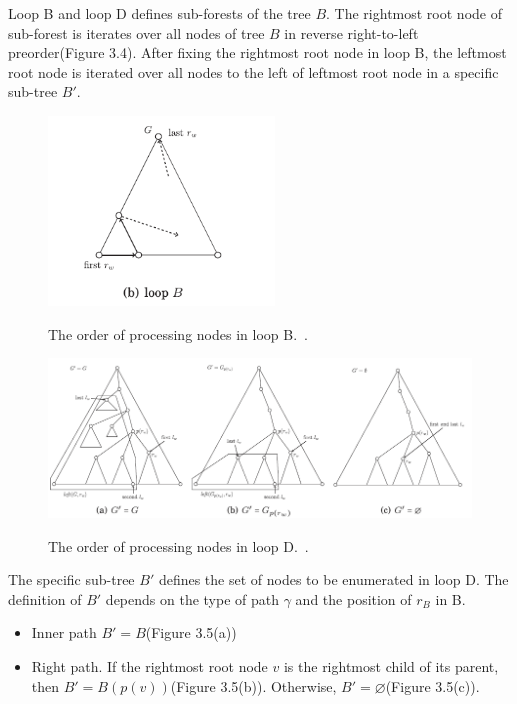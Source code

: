 Loop B and loop D defines sub-forests of the tree $B$. The rightmost root node of sub-forest is iterates over all nodes of tree $B$ in reverse right-to-left preorder(Figure 3.4). After fixing the rightmost root node in loop B, the leftmost root node is iterated over all nodes to the left of leftmost root node in a specific sub-tree $B'$. 

\begin{figure}
		\centering
		\includegraphics[width=6cm,clip]{Figures/loopB}
		\label{The order of processing nodes in loop B.} 
		\caption{The order of processing nodes in loop B.~\cite{pawlik2015efficient}.}
\end{figure}

\begin{figure}
		\centering
		\includegraphics[width=14cm,clip]{Figures/loopD}
		\label{The order of processing nodes in loop D.} 
		\caption{The order of processing nodes in loop D.~\cite{pawlik2015efficient}.}
\end{figure}

The specific sub-tree $B'$ defines the set of nodes to be enumerated in loop D. The definition of $B'$ depends on the type of path $\gamma$ and the position of $r_B$ in B.
\begin{itemize}
\item Inner path $B' = B$(Figure 3.5(a))
\item Right path. If the rightmost root node $v$ is the rightmost child of its parent, then $B' = B(p(v))$(Figure 3.5(b)). Otherwise, $B' = \varnothing$(Figure 3.5(c)). 
\end{itemize}

